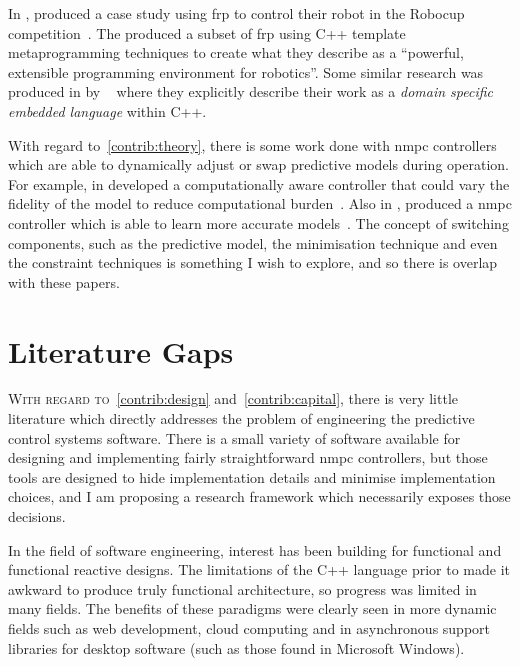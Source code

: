 In \citeyear{Peterson2001a}, \citeauthor{Peterson2001a} produced a case study
using \ac{frp} to control their robot in the  Robocup
competition~\cite{Peterson2001a}. The produced a subset of \ac{frp} using C++
template metaprogramming techniques to create what they describe as a
``powerful, extensible programming environment for robotics''. Some similar
research was produced in \citeyear{Xiangtian2002} by
\citeauthor{Xiangtian2002}~\cite{Xiangtian2002} where they explicitly describe
their work as a \emph{domain specific embedded language} within C++.

With regard to~\ref{contrib:theory}, there is some work done with \ac{nmpc}
controllers which are able to dynamically adjust or swap predictive models
during operation. For example, in  \citeauthor[and related
work]{Zhang2016} developed a computationally aware controller that could vary
the fidelity of the model to reduce computational burden~\cite[and related
work]{Zhang2016}. Also in , \citeauthor{Ostafew2016} produced a
\ac{nmpc} controller which is able to learn more accurate
models~\cite{Ostafew2016}. The concept of switching components, such as the
predictive model, the minimisation technique and even the constraint techniques
is something I wish to explore, and so there is overlap with these papers.



\section{Literature Gaps}%
\label{sec:literature-gaps}


\textsc{With regard to}~\ref{contrib:design} and~\ref{contrib:capital}, there is
very little literature which directly addresses the problem of engineering the
predictive control systems software. There is a small variety of software
available for designing and implementing fairly straightforward \ac{nmpc}
controllers, but those tools are designed to hide implementation details and
minimise implementation choices, and I am proposing a research framework which
necessarily exposes those decisions.

In the field of software engineering, interest has been building for functional
and functional reactive designs. The limitations of the C++ language prior to
 made it awkward to produce truly functional architecture, so
progress was limited in many fields. The benefits of these paradigms were
clearly seen in more dynamic fields such as web development, cloud computing and
in asynchronous support libraries for desktop software (such as those found in
Microsoft Windows).

